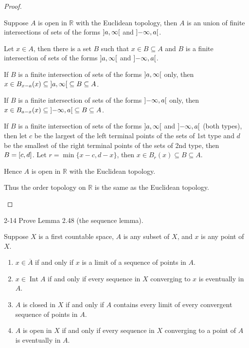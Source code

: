 \begin{proof}
\begin{enumerate}[label={(\alph*)}]
		      Suppose $A$ is open in $\mathbb{R}$ with the Euclidean topology, then $A$ is an union of finite intersections of sets of the forms $\left]{a,\infty}\right[$ and $\left]{-\infty,a}\right[$.

		      Let $x\in A$, then there is a set $B$ such that $x\in B\subseteq A$ and $B$ is a finite intersection of sets of the forms $\left]{a,\infty}\right[$ and $\left]{-\infty,a}\right[$.

		      If $B$ is a finite intersection of sets of the forms $\left]{a,\infty}\right[$ only, then $x\in B_{x - a}(x)\subseteq \left]{a,\infty}\right[ \subseteq B\subseteq A$.

		      If $B$ is a finite intersection of sets of the forms $\left]{-\infty,a}\right[$ only, then $x\in B_{a - x}(x)\subseteq \left]{-\infty,a}\right[\subseteq B\subseteq A$.

		      If $B$ is a finite intersection of sets of the forms $\left]{a,\infty}\right[$ and $\left]{-\infty,a}\right[$ (both types), then let $c$ be the largest of the left terminal points of the sets of 1st type and $d$ be the smallest of the right terminal points of the sets of 2nd type, then $B = \left[{c, d}\right]$. Let $r = \min\{ x - c, d - x \}$, then $x\in B_{r}(x)\subseteq B\subseteq A$.

		      Hence $A$ is open in $\mathbb{R}$ with the Euclidean topology.

		      Thus the order topology on $\mathbb{R}$ is the same as the Euclidean topology.
	\end{enumerate}
\end{proof}

\begin{problem}{2-14}
Prove Lemma 2.48 (the sequence lemma).

Suppose $X$ is a first countable space, $A$ is any subset of $X$, and $x$ is any point of $X$.
\begin{enumerate}[label={(\alph*)}]
	\item $x\in \overline{A}$ if and only if $x$ is a limit of a sequence of points in $A$.
	\item $x\in\operatorname{Int}A$ if and only if every sequence in $X$ converging to $x$ is eventually in $A$.
	\item $A$ is closed in $X$ if and only if $A$ contains every limit of every convergent sequence of points in $A$.
	\item $A$ is open in $X$ if and only if every sequence in $X$ converging to a point of $A$ is eventually in $A$.
\end{enumerate}
\end{problem}

